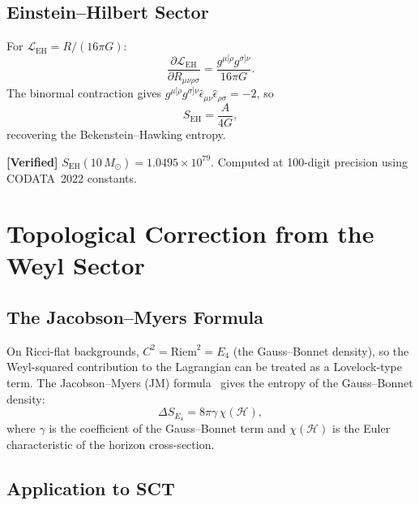 \documentclass[11pt,a4paper]{article}
\theoremstyle{plain}
\theoremstyle{definition}
\newcommand{\verified}[1]{%
  \par\smallskip\noindent
  \colorbox{green!10}{\parbox{\dimexpr\linewidth-2\fboxsep}{%
    \textcolor{green!50!black}{\textbf{[Verified]}} #1}}%
  \par\smallskip}
\begin{document}
\subsection{Einstein--Hilbert Sector}

For $\mathcal{L}_{\mathrm{EH}} = R/(16\pi G)$:
\begin{equation}
  \frac{\partial\mathcal{L}_{\mathrm{EH}}}{\partial R_{\mu\nu\rho\sigma}}
  = \frac{g^{\mu[\rho}g^{\sigma]\nu}}{16\pi G}.
\end{equation}
The binormal contraction gives
$g^{\mu[\rho}g^{\sigma]\nu}\hat{\epsilon}_{\mu\nu}
\hat{\epsilon}_{\rho\sigma} = -2$, so
\begin{equation}\label{eq:S-EH}
  S_{\mathrm{EH}} = \frac{A}{4G},
\end{equation}
recovering the Bekenstein--Hawking entropy.

\verified{$S_{\mathrm{EH}}(10\,M_\odot) = 1.0495 \times 10^{79}$.
Computed at 100-digit precision using CODATA~2022 constants.}

\section{Topological Correction from the Weyl Sector}
\label{sec:weyl}

\subsection{The Jacobson--Myers Formula}

On Ricci-flat backgrounds, $C^2 = \mathrm{Riem}^2 = E_4$
(the Gauss--Bonnet density), so the Weyl-squared contribution
to the Lagrangian can be treated as a Lovelock-type term.
The Jacobson--Myers (JM) formula~\cite{JM93} gives the entropy
of the Gauss--Bonnet density:
\begin{equation}\label{eq:jm-formula}
  \Delta S_{E_4} = 8\pi\gamma\,\chi(\mathcal{H}),
\end{equation}
where $\gamma$ is the coefficient of the Gauss--Bonnet term and
$\chi(\mathcal{H})$ is the Euler characteristic of the horizon
cross-section.

\subsection{Application to SCT}
\end{document}
